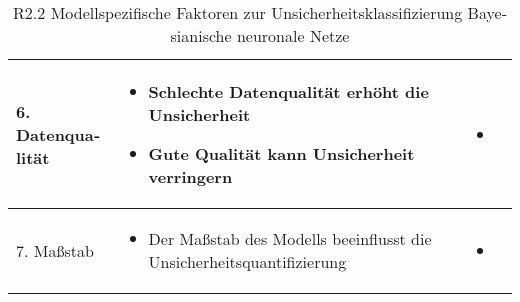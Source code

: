\begin{otherlanguage}{ngerman}
\begin{table}[!htpb]
\begin{tabularx}{\textwidth}{|l|X|X|}
    \multirow{4}{*}{6. Datenqualität} &
    \begin{itemize}[leftmargin=*, topsep=0em, itemsep=0em, label={}]
      \item Schlechte Datenqualität erhöht die Unsicherheit
      \item Gute Qualität kann Unsicherheit verringern
    \end{itemize} &
    \begin{itemize}[leftmargin=*, topsep=0em, itemsep=0em, label={}]
      \item \parencite[S.~16]{bishop2006pattern}
    \end{itemize} \\ \hline

    \multirow{4}{*}{7. Maßstab} &
    \begin{itemize}[leftmargin=*, topsep=0em, itemsep=0em, label={}]
      \item Der Maßstab des Modells beeinflusst die Unsicherheitsquantifizierung
    \end{itemize} &
    \begin{itemize}[leftmargin=*, topsep=0em, itemsep=0em, label={}]
      \item \parencite[S.~29–31]{gal2016uncertainty}
    \end{itemize} \\ \hline

  \end{tabularx}
  \caption{R2.2 Modellspezifische Faktoren zur Unsicherheitsklassifizierung \gls{Bayesianische neuronale Netze}}
  \label{tab:chapter6r22}
\end{table}




\end{otherlanguage}
